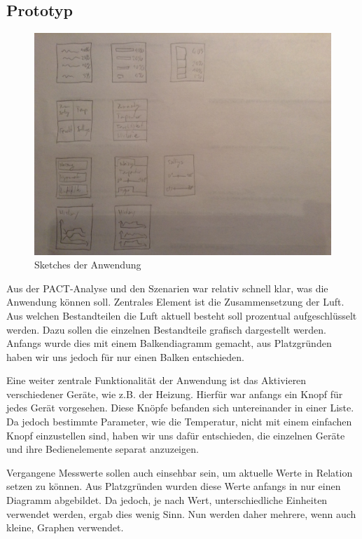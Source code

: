 \documentclass[a4paper,10pt]{article}
\begin{document}
\newpage



\subsection{Prototyp}

\begin{figure}[!h]
	\centering
	\includegraphics[scale=0.3]{images/sketches2.jpg}
	\caption{Sketches der Anwendung}
\end{figure}

Aus der PACT-Analyse und den Szenarien war relativ schnell klar, was die Anwendung können soll. Zentrales Element ist die Zusammensetzung der Luft. Aus welchen Bestandteilen die Luft aktuell besteht soll prozentual aufgeschlüsselt werden. Dazu sollen die einzelnen Bestandteile grafisch dargestellt werden. Anfangs wurde dies mit einem Balkendiagramm gemacht, aus Platzgründen haben wir uns jedoch für nur einen Balken entschieden.

Eine weiter zentrale Funktionalität der Anwendung ist das Aktivieren verschiedener Geräte, wie z.B. der Heizung. Hierfür war anfangs ein Knopf für jedes Gerät vorgesehen. Diese Knöpfe befanden sich untereinander in einer Liste. Da jedoch bestimmte Parameter, wie die Temperatur, nicht mit einem einfachen Knopf einzustellen sind, haben wir uns dafür entschieden, die einzelnen Geräte und ihre Bedienelemente separat anzuzeigen.

Vergangene Messwerte sollen auch einsehbar sein, um aktuelle Werte in Relation setzen zu können. Aus Platzgründen wurden diese Werte anfangs in nur einen Diagramm abgebildet. Da jedoch, je nach Wert, unterschiedliche Einheiten verwendet werden, ergab dies wenig Sinn. Nun werden daher mehrere, wenn auch kleine, Graphen verwendet.
\end{document}
